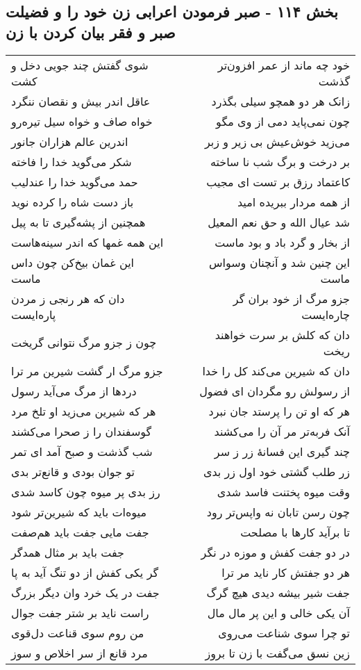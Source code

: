 \begin{center}
\section*{بخش ۱۱۴ - صبر فرمودن اعرابی زن خود را و فضیلت صبر و فقر بیان کردن با زن}
\label{sec:sh114}
\begin{longtable}{l p{0.5cm} r}
شوی گفتش چند جویی دخل و کشت
&&
خود چه ماند از عمر افزون‌تر گذشت
\\
عاقل اندر بیش و نقصان ننگرد
&&
زانک هر دو همچو سیلی بگذرد
\\
خواه صاف و خواه سیل تیره‌رو
&&
چون نمی‌پاید دمی از وی مگو
\\
اندرین عالم هزاران جانور
&&
می‌زید خوش‌عیش بی زیر و زبر
\\
شکر می‌گوید خدا را فاخته
&&
بر درخت و برگ شب نا ساخته
\\
حمد می‌گوید خدا را عندلیب
&&
کاعتماد رزق بر تست ای مجیب
\\
باز دست شاه را کرده نوید
&&
از همه مردار ببریده امید
\\
همچنین از پشه‌گیری تا به پیل
&&
شد عیال الله و حق نعم المعیل
\\
این همه غمها که اندر سینه‌هاست
&&
از بخار و گرد باد و بود ماست
\\
این غمان بیخ‌کن چون داس ماست
&&
این چنین شد و آنچنان وسواس ماست
\\
دان که هر رنجی ز مردن پاره‌ایست
&&
جزو مرگ از خود بران گر چاره‌ایست
\\
چون ز جزو مرگ نتوانی گریخت
&&
دان که کلش بر سرت خواهند ریخت
\\
جزو مرگ ار گشت شیرین مر ترا
&&
دان که شیرین می‌کند کل را خدا
\\
دردها از مرگ می‌آید رسول
&&
از رسولش رو مگردان ای فضول
\\
هر که شیرین می‌زید او تلخ مرد
&&
هر که او تن را پرستد جان نبرد
\\
گوسفندان را ز صحرا می‌کشند
&&
آنک فربه‌تر مر آن را می‌کشند
\\
شب گذشت و صبح آمد ای تمر
&&
چند گیری این فسانهٔ زر ز سر
\\
تو جوان بودی و قانع‌تر بدی
&&
زر طلب گشتی خود اول زر بدی
\\
رز بدی پر میوه چون کاسد شدی
&&
وقت میوه پختنت فاسد شدی
\\
میوه‌ات باید که شیرین‌تر شود
&&
چون رسن تابان نه واپس‌تر رود
\\
جفت مایی جفت باید هم‌صفت
&&
تا برآید کارها با مصلحت
\\
جفت باید بر مثال همدگر
&&
در دو جفت کفش و موزه در نگر
\\
گر یکی کفش از دو تنگ آید به پا
&&
هر دو جفتش کار ناید مر ترا
\\
جفت در یک خرد وان دیگر بزرگ
&&
جفت شیر بیشه دیدی هیچ گرگ
\\
راست ناید بر شتر جفت جوال
&&
آن یکی خالی و این پر مال مال
\\
من روم سوی قناعت دل‌قوی
&&
تو چرا سوی شناعت می‌روی
\\
مرد قانع از سر اخلاص و سوز
&&
زین نسق می‌گفت با زن تا بروز
\\
\end{longtable}
\end{center}
